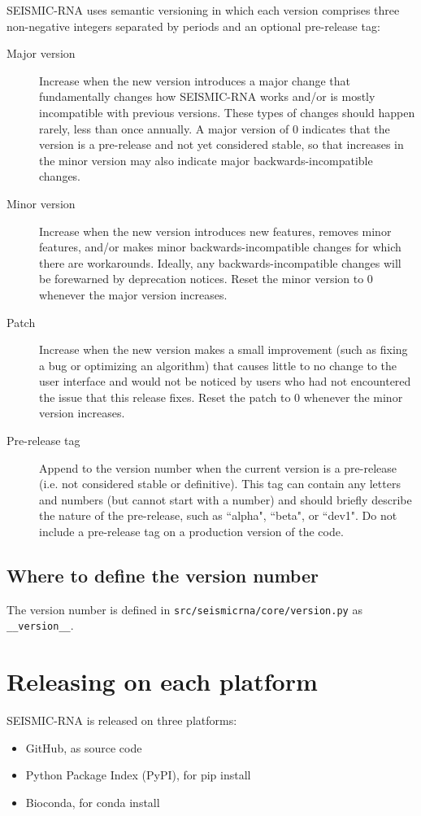 \documentclass[main.tex]{subfiles}
\begin{document}
SEISMIC-RNA uses semantic versioning in which each version comprises three non-negative integers separated by periods and an optional pre-release tag:
\begin{description}
    \item[Major version] Increase when the new version introduces a major change that fundamentally changes how SEISMIC-RNA works and/or is mostly incompatible with previous versions. These types of changes should happen rarely, less than once annually. A major version of 0 indicates that the version is a pre-release and not yet considered stable, so that increases in the minor version may also indicate major backwards-incompatible changes.
    \item[Minor version] Increase when the new version introduces new features, removes minor features, and/or makes minor backwards-incompatible changes for which there are workarounds. Ideally, any backwards-incompatible changes will be forewarned by deprecation notices. Reset the minor version to 0 whenever the major version increases.
    \item[Patch] Increase when the new version makes a small improvement (such as fixing a bug or optimizing an algorithm) that causes little to no change to the user interface and would not be noticed by users who had not encountered the issue that this release fixes. Reset the patch to 0 whenever the minor version increases.
    \item[Pre-release tag] Append to the version number when the current version is a pre-release (i.e. not considered stable or definitive). This tag can contain any letters and numbers (but cannot start with a number) and should briefly describe the nature of the pre-release, such as ``alpha", ``beta", or ``dev1". Do not include a pre-release tag on a production version of the code.
\end{description}


\subsection{Where to define the version number}

The version number is defined in \verb|src/seismicrna/core/version.py| as \verb|__version__|.


\section{Releasing on each platform}

SEISMIC-RNA is released on three platforms:
\begin{itemize}
    \item GitHub, as source code
    \item Python Package Index (PyPI), for pip install
    \item Bioconda, for conda install
\end{itemize}
\end{document}
